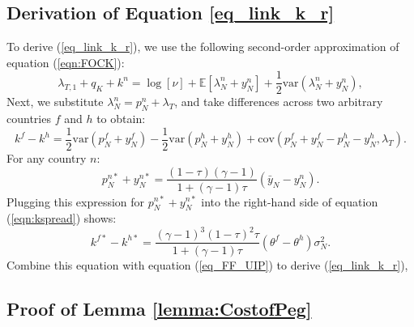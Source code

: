 \subsection{Derivation of Equation
  \eqref{eq_link_k_r} \label{app_cap}}

To derive (\ref{eq_link_k_r}), we use the following second-order
approximation of equation (\ref{eqn:FOCK}):
\begin{equation*}
  \lambda_{T, 1} + q_K + k^n
  = \log[\nu] + \mathbb{E}\left[ \lambda_N^n + y_N^n \right]
  + \frac{1}{2} \text{var}\left( \lambda_N^n + y_N^n \right),
\end{equation*}
Next, we substitute
$\lambda^{n}_{N}=p^{n}_{N}+ \lambda_T$, and take differences across
two arbitrary countries $f$ and $h$ to obtain:
\begin{equation}
  k^f - k^h
  = \frac{1}{2} \text{var}\left( p_{N}^f + y_{N}^f \right)
  - \frac{1}{2} \text{var}\left( p_{N}^h + y_{N}^h \right)
  + \text{cov}\left( p_{N}^f + y_{N}^f - p_{N}^h - y_{N}^h, \lambda_{T}\right).
  \label{eqn:kspread} 
\end{equation}
For any country $n$:
\begin{equation*}
  p_{N}^{n*}  + y_{N}^{n*} = 
  \frac{(1 - \tau)(\gamma - 1)}{1 + (\gamma - 1) \tau}
  \left( \bar{y}_{N} - y_{N}^n \right).
\end{equation*}
Plugging this expression for $p_{N}^{n*} + y_{N}^{n*}$ into the
right-hand side of equation (\ref{eqn:kspread}) shows:
\begin{equation*}
  k^{f*} - k^{h*} = 
  \frac{(\gamma - 1)^3 (1 - \tau)^2 \tau}{1 + (\gamma - 1) \tau}
  \left( \theta^f - \theta^h \right)\sigma_N^2. 
\end{equation*}
Combine this equation with equation (\ref{eq_FF_UIP}) to derive
(\ref{eq_link_k_r}),

\subsection{Proof of Lemma
  \ref{lemma:CostofPeg}
  \label{Appendix_ProofCostofPeg}}

